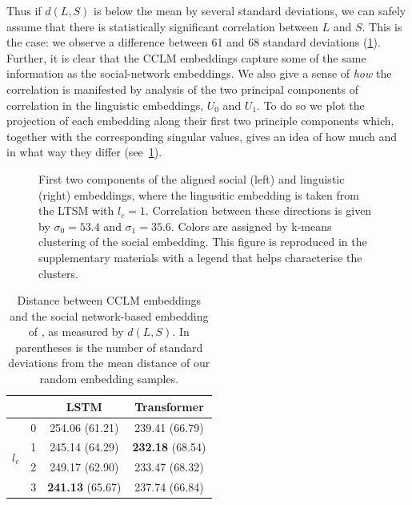 \documentclass[11pt]{article}
\begin{document}
Thus if \(d(L,S)\) is below the mean by several standard deviations, we can safely
assume that there is statistically significant correlation between
\(L\) and \(S\).  This is the case: we observe a difference between 61 and 68 standard deviations
(\cref{tab:embedding-correlations}). Further, it is clear that the CCLM embeddings
capture some of the same information as the social-network embeddings.
We also give a sense of \emph{how} the correlation is manifested by
analysis of the two principal components of correlation in the
linguistic embeddings, \(U_0\) and \(U_1\). To do so we plot the
projection of each embedding along their first two principle components
which, together with the corresponding singular values, gives an idea
of how much and in what way they differ (see~\cref{fig:pca-aligned}).


\begin{figure}[t]
    \centering
    \PCAAligned 
  \caption{First two components of the aligned social (left) and linguistic (right) embeddings,
    where the lingusitic embedding is taken from the LTSM with $l_c=1$.
    Correlation between these directions is given by $\sigma_0 = 53.4$ and $\sigma_1 = 35.6$.
    Colors are assigned by k-means clustering of the social embedding. 
    This figure is reproduced in the supplementary materials with a legend that helps 
    characterise the clusters.
  }
  \label{fig:pca-aligned}
\end{figure}



\begin{table}
\centering
\begin{tabular}{llcc}
\toprule
                        &   & LSTM     & Transformer \\
\midrule
  \multirow{4}{*}{$l_c$}  & 0 &         254.06  (61.21) &         239.41  (66.79)  \\
                          & 1 &         245.14  (64.29) & \textbf{232.18} (68.54)   \\
                          & 2 &         249.17  (62.90) &         233.47  (68.32)  \\
                          & 3 & \textbf{241.13} (65.67) &         237.74   (66.84) \\
\bottomrule
\end{tabular}
\caption{Distance between CCLM embeddings and the social network-based embedding
of \citet{Kumar2018}, as measured by $d(L,S)$. In parentheses is the number of standard deviations
from the mean distance of our random embedding samples.} \label{tab:embedding-correlations}
\end{table}
\end{document}

